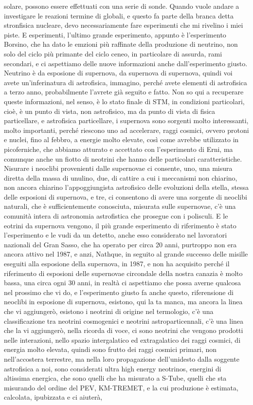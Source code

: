 solare, possono essere effettuati con una serie di sonde. Quando vuole andare a investigare le reazioni termine di globali, e questo fa parte della branca detta stronfisica nucleare, devo necessariamente fare esperimenti che mi rivelino i miei piste. E esperimenti, l'ultimo grande esperimento, appunto è l'esperimento Borsino, che ha dato le emzioni più raffinate della produzione di neutrino, non solo del ciclo più primante del ciclo ceneo, in particolare di assurda, rami secondari, e ci aspettiamo delle nuove informazioni anche dall'esperimento giusto. Neutrino è da esposione di supernova, da supernova di supernova, quindi voi avete un'inferinatura di astrofisica, immagino, perché avete elementi di astrofisica a terzo anno, probabilmente l'avrete già seguito e fatto. Non so qui a recuperare queste informazioni, nel senso, è lo stato finale di STM, in condizioni particolari, cioè, è un punto di vista, non astrofisico, ma da punto di vista di fisica particellare, e astrofisica particellare, i supernova sono sorgenti molto interessanti, molto importanti, perché riescono uno ad accelerare, raggi cosmici, ovvero protoni e nuclei, fino al febbro, a energie molto elevate, così come avrebbe utilizzato in picoferniche, che abbiamo atturato e accettato con l'esperimento di Erni, ma comunque anche un fiotto di neotrini che hanno delle particolari caratteristiche. Nisurare i neoclibi provenienti dalle supernovae ci consente, uno, una misura diretta della massa di unulino, due, di cattire a cui i meccanismi non chiarino, non ancora chiarino l'appoggiungista astrofisico delle evoluzioni della stella, stessa delle esposioni di supernova, e tre, ci consentono di avere una sorgente di neoclibi naturali, che è sufficientemente conosciuta, misurata sulle supernovae, c'è una comunità intera di astronomia astrofistica che prosegue con i polisculi. E le eotrini da supernova vengono, il più grande esperimento di riferimento è stato l'esperimento e le vudi da un detetto, anche esso considerato nel lavoratori nazionali del Gran Sasso, che ha operato per circa 20 anni, purtroppo non era ancora attivo nel 1987, e anzi, Nathque, in seguito al grande successo delle misille eseguiti alla esposione della supernova, in 1987, e non ha acquisito perché il riferimento di esposioni delle supernovae circondale della nostra canazia è molto bassa, una circa ogni 30 anni, in realtà ci aspettiamo che possa averne qualcosa nel prossimo che vi do, e l'esperimento giusto fa anche questo, riferensione di neoclibi in esposione di supernova, esistono, qui la ta manca, ma ancora la linea che vi aggiungerò, esistono i neotrini di origine nel termologio, c'è una classificazione tra neotrini cosmogenici e neotrini astroparticennali, c'è una linea che la vi aggiungerò, nella ricorda di voce, ci sono neotrini che vengono prodotti nelle interazioni, nello spazio intergalatico ed extragalatico dei raggi cosmici, di energia molto elevata, quindi sono frutto dei raggi cosmici primari, non nell'accostera terrestre, ma nella loro propagazione dell'unidesto dalla soggente astrofisica a noi, sono considerati ultra high energy neotrinos, energini di altissima energica, che sono quelli che ha misurato a S-Tube, quelli che sta misurando del ordine del PEV, KM-TREMET, e la cui produzione è estimata, calcolata, ipubizzata e ci aiuterà, 